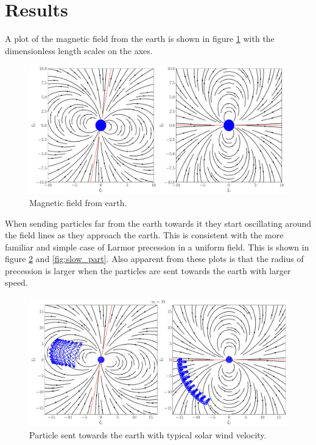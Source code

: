\section{Results}

A plot of the magnetic field from the earth is shown in figure \ref{fig:earth} with the dimensionless length scales on the axes. 

\begin{figure}[htb]
	\centering
	\includegraphics[width=\columnwidth]{../fig/earth.pdf}
	\caption{Magnetic field from earth.}
	\label{fig:earth}
\end{figure}

When sending particles far from the earth towards it they start oscillating around the field lines as they approach the earth. This is consistent with the more familiar and simple case of Larmor precession in a uniform field. This is shown in figure \ref{fig:fast_part} and \ref{fig:slow_part}. Also apparent from these plots is that the radius of precession is larger when the particles are sent towards the earth with larger speed.

\begin{figure}[htb]
	\centering
	\includegraphics[width=\columnwidth]{../fig/earth_traj_fast.pdf}
	\caption{Particle sent towards the earth with typical solar wind velocity.}
	\label{fig:fast_part}
\end{figure}

